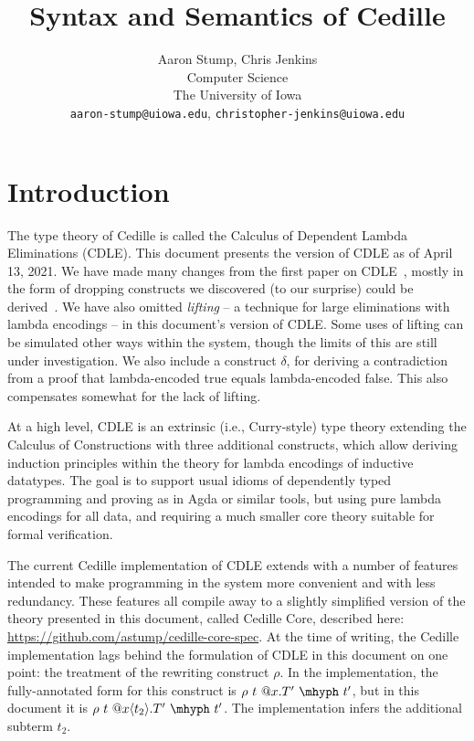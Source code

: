 \documentclass{article}
\begin{document}
\title{Syntax and Semantics of Cedille}

\author{Aaron Stump, Chris Jenkins \\
  Computer Science \\
  The University of Iowa \\
  \texttt{aaron-stump@uiowa.edu},
  \texttt{christopher-jenkins@uiowa.edu}}

\date{}

\maketitle

\section{Introduction}

The type theory of Cedille is called the Calculus of Dependent Lambda
Eliminations (CDLE).  This document presents the version of CDLE as of
April 13, 2021.  We have made many changes from the first paper on CDLE~\cite{stump17},
mostly in the form of dropping constructs we discovered (to our
surprise) could be derived~\cite{stump18}. We have also omitted
\emph{lifting} -- a technique for large eliminations with lambda
encodings -- in this document's version of CDLE.  Some uses of lifting
can be simulated other ways within the system, though the limits of
this are still under investigation.  We also include a construct
$\delta$, for deriving a contradiction from a proof that
lambda-encoded true equals lambda-encoded false.  This also
compensates somewhat for the lack of lifting.

At a high level, CDLE is an extrinsic (i.e., Curry-style) type theory
extending the Calculus of Constructions with three additional
constructs, which allow deriving induction principles within the
theory for lambda encodings of inductive datatypes.  The goal is to support
usual idioms of dependently typed programming and proving as in Agda or
similar tools, but using pure lambda encodings for all data, and
requiring a much smaller core theory suitable for formal verification.

The current Cedille implementation of CDLE extends with a number of features
intended to make programming in the system more convenient and with less
redundancy.
These features all compile away to a slightly simplified version of the
theory presented in this document, called Cedille Core, described
here: \url{https://github.com/astump/cedille-core-spec}.
At the time of writing, the Cedille implementation lags behind the formulation
of CDLE in this document on one point: the treatment of the rewriting construct
\(\rho\).
In the implementation, the fully-annotated form for this construct is \(\rho\ t\
@x.T'\ \mhyph\ t'\), but in this document it is \(\rho\ t\ @x\langle
t_2 \rangle.T'\ \mhyph\ t'\).
The implementation infers the additional subterm \(t_2\).
\end{document}
